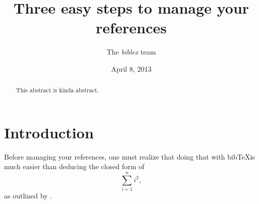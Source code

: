 \documentclass[11pt]{article}
\title{Three easy steps to manage your references}
\date{April 8, 2013}
\author{The \textit{biblex} team}
\begin{document}
\maketitle

\begin{abstract}
This abstract is kinda abstract.
\end{abstract}

\section{Introduction} Before managing your references, one must realize that doing that with bib\TeX is much easier than deducing the closed form of
\[\sum_{i = 1}^n i^2,\]
as outlined by \cite{biblex13}.


{}
\end{document}
